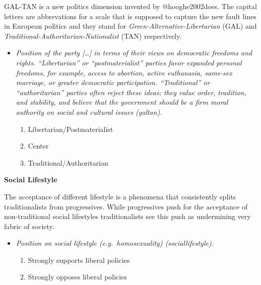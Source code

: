 \documentclass[]{article}
\providecommand{\tightlist}{%
  \setlength{\itemsep}{0pt}\setlength{\parskip}{0pt}}
\begin{document}
GAL-TAN is a new politics dimension invented by @hooghe2002does. The
capital letters are abbrevations for a scale that is supposed to capture
the new fault lines in European politics and they stand for
\emph{Green-Alternative-Libertarian} (GAL) and
\emph{Traditional-Authoritarian-Nationalist} (TAN) respectively.

\begin{itemize}
\tightlist
\item
  \emph{Position of the party {[}\ldots{}{]} in terms of their views on
  democratic freedoms and rights. ``Libertarian'' or ``postmaterialist''
  parties favor expanded personal freedoms, for example, access to
  abortion, active euthanasia, same-sex marriage, or greater democratic
  participation. ``Traditional'' or ``authoritarian'' parties often
  reject these ideas; they value order, tradition, and stability, and
  believe that the government should be a firm moral authority on social
  and cultural issues (galtan).}

  \begin{enumerate}
  \def\labelenumi{\arabic{enumi}.}
  \setcounter{enumi}{-1}
  \tightlist
  \item
    Libertarian/Postmaterialist
  \item
    Center
  \item
    Traditional/Authoritarian
  \end{enumerate}
\end{itemize}

\textbf{Social Lifestyle}

The acceptance of different lifestyle is a phenomena that consistently
splits traditionalists from progressives. While progressives push for
the acceptance of non-traditional social lifestyles traditionalists see
this push as undermining very fabric of society.

\begin{itemize}
\tightlist
\item
  \emph{Position on social lifestyle (e.g.~homosexuality)
  (sociallifestyle).}

  \begin{enumerate}
  \def\labelenumi{\arabic{enumi}.}
  \setcounter{enumi}{-1}
  \tightlist
  \item
    Strongly supports liberal policies
  \item
    Strongly opposes liberal policies
  \end{enumerate}
\end{itemize}
\end{document}

